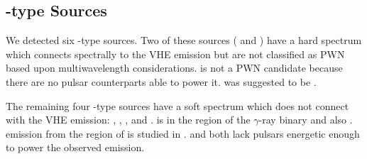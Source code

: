 \subsection{\OtherClass-type Sources}

We detected six \OtherClass-type sources.  Two of these sources
( and ) have a hard spectrum which connects
spectrally to the \ac{VHE} emission but are not classified as \ac{PWN}
based upon multiwavelength considerations.   is not
a \ac{PWN} candidate because there are no pulsar counterparts able to
power it.   was suggested to be 
\citep[W30,][]{ajello_2012a_fermi-large}.

The remaining four \OtherClass-type sources have a soft spectrum
which does not connect with the \ac{VHE} emission: ,
, , and .  
is in the region of the $\gamma$-ray binary 
\citep{the-fermi-lat-collaboration_2012a_periodic-emission} and also
.  \gev emission from the region of  is studied
in \cite{domainko_2012a_exploring-nature}.   and 
both lack pulsars energetic enough to power the observed emission.



